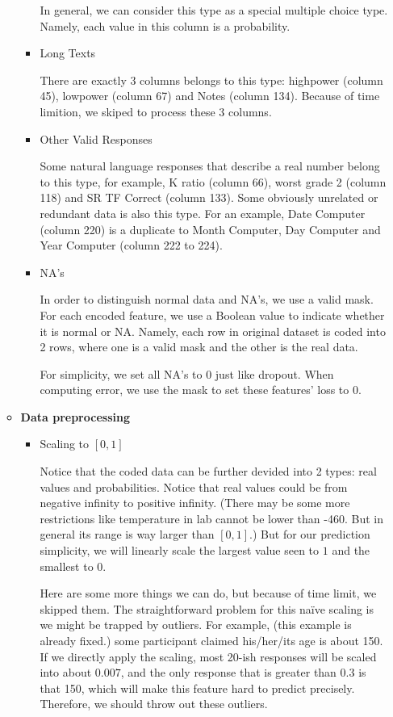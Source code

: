\documentclass[11pt, a4paper]{article}
\begin{document}
\begin{enumerate}
\begin{itemize}
\begin{itemize}
			\par{In general, we can consider this type as a special multiple choice type. Namely, each value in this column is a probability.}
			\item {Long Texts}
			\par{There are exactly 3 columns belongs to this type: highpower (column 45), lowpower (column 67) and Notes (column 134). Because of time limition, we skiped to process these 3 columns.}
			\item {Other Valid Responses}
			\par{Some natural language responses that describe a real number belong to this type, for example, K ratio (column 66), worst grade 2 (column 118) and SR TF Correct (column 133). Some obviously unrelated or redundant data is also this type. For an example, Date Computer (column 220) is a duplicate to Month Computer, Day Computer and Year Computer (column 222 to 224).}
			\item {NA's}
			\par{In order to distinguish normal data and NA's, we use a valid mask. For each encoded feature, we use a Boolean value to indicate whether it is normal or NA. Namely, each row in original dataset is coded into 2 rows, where one is a valid mask and the other is the real data.}
			\par{For simplicity, we set all NA’s to 0 just like dropout. When computing error, we use the mask to set these features’ loss to 0.}
		\end{itemize}
		\item {\textbf{Data preprocessing}}
		\begin{itemize}
			\item {Scaling to $[0, 1]$}
			\par{Notice that the coded data can be further devided into 2 types: real values and probabilities. Notice that real values could be from negative infinity to positive infinity. (There may be some more restrictions like temperature in lab cannot be lower than -460. But in general its range is way larger than $[0, 1]$.) But for our prediction simplicity, we will linearly scale the largest value seen to $1$ and the smallest to $0$.}
			\par{Here are some more things we can do, but because of time limit, we skipped them. The straightforward problem for this naïve scaling is we might be trapped by outliers. For example, (this example is already fixed.) some participant claimed his/her/its age is about 150. If we directly apply the scaling, most 20-ish responses will be scaled into about $0.007$, and the only response that is greater than $0.3$ is that 150, which will make this feature hard to predict precisely. Therefore, we should throw out these outliers.}

\end{itemize}
\end{itemize}
\end{enumerate}
\end{document}
